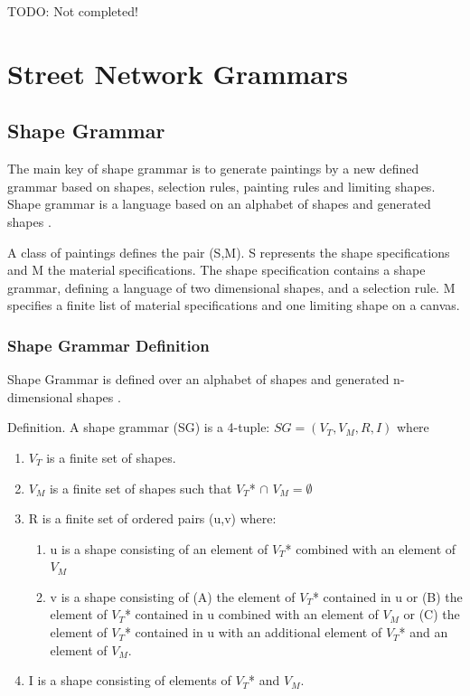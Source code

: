 \documentclass[11pt, a4paper]{report}
\begin{document}
TODO: Not completed!
\chapter{Street Network Grammars}
\section{Shape Grammar}
The main key of shape grammar is to generate paintings by a new defined grammar based on shapes, selection rules, painting rules and limiting shapes. Shape grammar is a language based on an alphabet of shapes and generated shapes \citep{shapeGrammars:1972}. 

A class of paintings defines the pair (S,M). S represents the shape specifications and M the material specifications. The shape specification contains a shape grammar, defining a language of two dimensional shapes, and a selection rule. M specifies a finite list of material specifications and one limiting shape on a canvas.

\subsection{Shape Grammar Definition}
\label{sec:Shape_Grammar_Definition}
Shape Grammar is defined over an alphabet of shapes and generated n-dimensional shapes \citep{shapeGrammars:1972}.
\begin{displayquote} 
    Definition. A shape grammar (SG) is a 4-tuple: $SG = (V_T, V_M, R, I)$ where
    \begin{enumerate}
        \item $V_T$ is a finite set of shapes.
        \item $V_M$ is a finite set of shapes such that $V_T $* $\cap$  $V_M = \emptyset$
        \item R is a finite set of ordered pairs (u,v) where:
        \begin{enumerate}
         \item u is a shape consisting of an element of $V_T $* combined with an element of $V_M$ \item v is a shape consisting of (A) the element of $V_T $* contained in u or (B) the element of $V_T $* contained in u combined with an element of $V_M$ or (C) the element of $V_T $* contained in u with an additional element of $V_T$* and an element of $V_M$.
        \end{enumerate}
        \item I is a shape consisting of elements of $V_T $* and $V_M$.
    \end{enumerate}
\end{displayquote}
\end{document}
